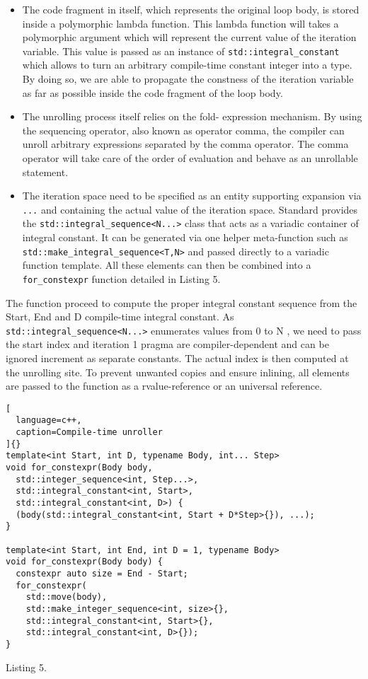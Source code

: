 \documentclass[../main]{subfiles}
\begin{document}
\begin{itemize}
\item The code fragment in itself, which represents
the original loop body, is stored inside a
polymorphic lambda function. This lambda
function will takes a polymorphic argument which
will represent the current value of the iteration
variable. This value is passed as an instance of
\lstinline{std::integral_constant} which allows to
turn an arbitrary compile-time constant integer into
a type. By doing so, we are able to propagate the
constness of the iteration variable as far as possible
inside the code fragment of the loop body.

\item The unrolling process itself relies on the fold-
expression mechanism. By using the sequencing
operator, also known as operator comma, the
compiler can unroll arbitrary expressions separated
by the comma operator. The comma operator will
take care of the order of evaluation and behave as
an unrollable statement.

\item The iteration space need to be specified
as an entity supporting expansion via \lstinline{...}
and containing the actual value of the
iteration space. Standard \cpp provides the
\lstinline{std::integral_sequence<N...>} class that
acts as a variadic container of integral constant. It
can be generated via one helper meta-function such
as \lstinline{std::make_integral_sequence<T,N>}
and passed directly to a variadic function template.
All these elements can then be combined into a
\lstinline{for_constexpr} function detailed in Listing 5.
\end{itemize}

The function proceed to compute the proper
integral constant sequence from the Start,
End and D compile-time integral constant. As
\lstinline{std::integral_sequence<N...>} enumerates values
from 0 to N , we need to pass the start index and iteration
1 pragma are compiler-dependent and can be ignored
increment as separate constants. The actual index is then
computed at the unrolling site. To prevent unwanted copies
and ensure inlining, all elements are passed to the function
as a rvalue-reference or an universal reference.

\begin{lstlisting}[
  language=c++,
  caption=Compile-time unroller
]{}
template<int Start, int D, typename Body, int... Step>
void for_constexpr(Body body,
  std::integer_sequence<int, Step...>,
  std::integral_constant<int, Start>,
  std::integral_constant<int, D>) {
  (body(std::integral_constant<int, Start + D*Step>{}), ...);
}

template<int Start, int End, int D = 1, typename Body>
void for_constexpr(Body body) {
  constexpr auto size = End - Start;
  for_constexpr(
    std::move(body),
    std::make_integer_sequence<int, size>{},
    std::integral_constant<int, Start>{},
    std::integral_constant<int, D>{});
}
\end{lstlisting}
Listing 5.
\end{document}
